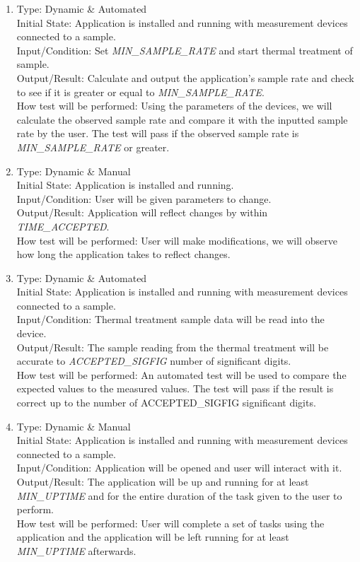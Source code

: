 \documentclass[12pt, titlepage]{article}
\begin{document}
\begin{adjustwidth}{2.2em}{0pt}
\begin{enumerate}[{NF-PT}1.]
  \item Type: Dynamic \& Automated\\
  Initial State: Application is installed and running with measurement devices connected to a sample.\\
  Input/Condition: Set \textsl{MIN\_SAMPLE\_RATE} and start thermal treatment of sample.\\
  Output/Result: Calculate and output the application's sample rate and check to see if it is greater or equal to \textsl{MIN\_SAMPLE\_RATE}.\\
  How test will be performed: Using the parameters of the devices, we will calculate the observed sample rate and compare it with the inputted sample rate by the user. The test will pass if the observed sample rate is \textsl{MIN\_SAMPLE\_RATE} or greater.
  
  \item Type: Dynamic \& Manual\\
  Initial State: Application is installed and running.\\
  Input/Condition: User will be given parameters to change.\\
  Output/Result: Application will reflect changes by within \textsl{TIME\_ACCEPTED}.\\
  How test will be performed: User will make modifications, we will observe how long the application takes to reflect changes. 

  \item Type: Dynamic \& Automated\\
  Initial State: Application is installed and running with measurement devices connected to a sample.\\
  Input/Condition: Thermal treatment sample data will be read into the device.\\
  Output/Result: The sample reading from the thermal treatment will be accurate to \textsl{ACCEPTED\_SIGFIG} number of significant digits.\\
  How test will be performed: An automated test will be used to compare the expected values to the measured values. The test will pass if the result is correct up to the number of {ACCEPTED\_SIGFIG} significant digits.

  \item Type: Dynamic \& Manual\\
  Initial State: Application is installed and running with measurement devices connected to a sample.\\
  Input/Condition: Application will be opened and user will interact with it.\\
  Output/Result: The application will be up and running for at least \textsl{MIN\_UPTIME} and for the entire duration of the task given to the user to perform.\\
  How test will be performed: User will complete a set of tasks using the application and the application will be left running for at least \textsl{MIN\_UPTIME} afterwards.

\end{enumerate}
\end{adjustwidth}
\end{document}
